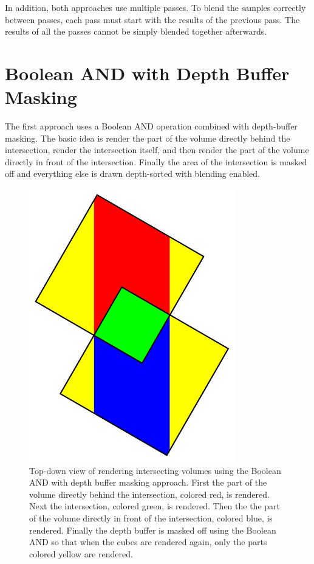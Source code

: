 \documentclass{report}
\begin{document}
In addition, both approaches use multiple passes.  To blend the samples
correctly between passes, each pass must start with the results of the previous
pass.  The results of all the passes cannot be simply blended together
afterwards.

\section{Boolean AND with Depth Buffer Masking}

The first approach uses a Boolean AND operation combined with depth-buffer
masking.  The basic idea is render the part of the volume directly behind the
intersection, render the intersection itself, and then render the part of the
volume directly in front of the intersection.  Finally the area of the
intersection is masked off and everything else is drawn depth-sorted with
blending enabled.

\begin{figure}
\centering
\includegraphics[width=0.8\textwidth]{boolean-and.pdf}
\caption{
Top-down view of rendering intersecting volumes using the Boolean AND with depth
buffer masking approach.  First the part of the volume directly behind the
intersection, colored red, is rendered.  Next the intersection, colored green,
is rendered.  Then the the part of the volume directly in front of the
intersection, colored blue, is rendered.  Finally the depth buffer is masked off
using the Boolean AND so that when the cubes are rendered again, only the parts
colored yellow are rendered.
}
\label{boolean-and}
\end{figure}
\end{document}
